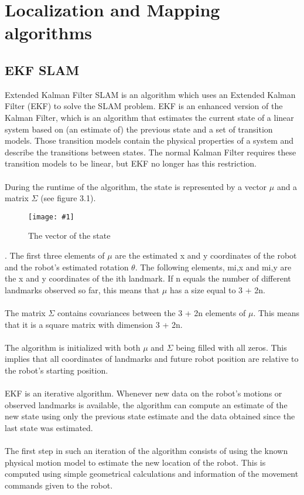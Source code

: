\documentclass{ba-kecs}
\numberwithin{figure}{section}
\numberwithin{equation}{section}
\newcommand{\dkepic}[2]{ %
	\begin{figure}[H] %
	\texttt{[image: \#1]}
	\caption{#2}
	\label{#1}
	\end{figure}
}
\begin{document}
\section{Localization and Mapping algorithms}

\subsection{EKF SLAM}
Extended Kalman Filter SLAM is an algorithm which uses an Extended Kalman Filter (EKF) to solve the SLAM problem. EKF is an enhanced version of the Kalman Filter, which is an algorithm that estimates the current state of a linear system based on (an estimate of) the previous state and a set of transition models. Those transition models contain the physical properties of a system and describe the transitions between states. The normal Kalman Filter requires these transition models to be linear, but EKF no longer has this restriction.\\ \\
	During the runtime of the algorithm, the state is represented by a vector $\mu$ and a matrix $\Sigma$ (see figure 3.1).\\
\dkepic{bigMatrix}{The vector of the state \cite{vec}}. 
The first three elements of $\mu$ are the estimated x and y coordinates of the robot and the robot’s estimated rotation $\theta$. The following elements, mi,x and mi,y are the x and y coordinates of the ith landmark. If n equals the number of different landmarks observed so far, this means that $\mu$ has a size equal to 3 + 2n.\\\\
The matrix $\Sigma$ contains covariances between the 3 + 2n elements of $\mu$. This means that it is a square matrix with dimension 3 + 2n.\\\\
The algorithm is initialized with both $\mu$ and $\Sigma$ being filled with all zeros. This implies that all coordinates of landmarks and future robot position are relative to the robot’s starting position. \\\\
EKF is an iterative algorithm. Whenever new data on the robot’s motions or observed landmarks is available, the algorithm can compute an estimate of the new state using only the previous state estimate and the data obtained since the last state was estimated.\\\\
The first step in such an iteration of the algorithm consists of using the known physical motion model to estimate the new location of the robot. This is computed using simple geometrical calculations and information of the movement commands given to the robot.\\\\
\end{document}
